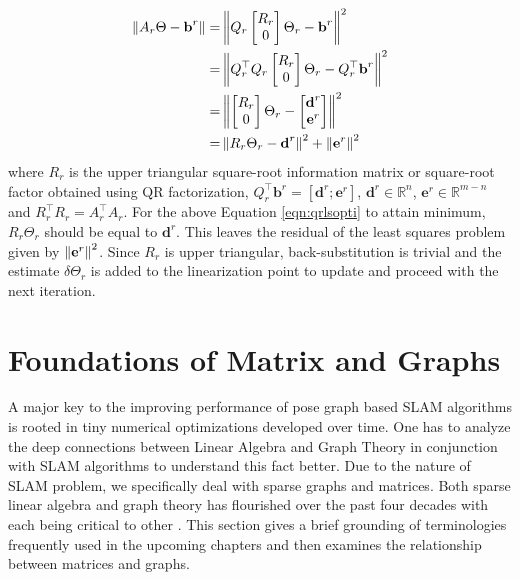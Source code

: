 \begin{align}
\left\lVert A_r\Theta-\textbf{b}^r\right\rVert = & \left\lVert Q_r \begin{bmatrix}
R_r \\
0
\end{bmatrix}\Theta_r - \textbf{b}^r\right\rVert^2 \\
= & \left\lVert Q_r^{\top}Q_r\begin{bmatrix}
R_r \\
0
\end{bmatrix}\Theta_r - Q_r^{\top}\textbf{b}^r\right\rVert^2 \\
= & \left\lVert\begin{bmatrix}
R_r \\
0
\end{bmatrix}\Theta_r - \begin{bmatrix}
\textbf{d}^r \\
\textbf{e}^r
\end{bmatrix}\right\rVert^2 \\
= & \left\lVert R_r\Theta_r - \textbf{d}^r\right\rVert^2 + \left\lVert\textbf{e}^r\right\rVert^2
\label{eqn:qrlsopti}
\end{align}
where $R_r$ is the upper triangular square-root information matrix or square-root factor obtained using QR factorization, $Q_r^{\top}\textbf{b}^r = [\textbf{d}^r; \textbf{e}^r]$, $\textbf{d}^r \in \mathbb{R}^n$, $\textbf{e}^r \in \mathbb{R}^{m-n}$ and $R_r^{\top}R_r = A_r^{\top}A_r$. For the above Equation \ref{eqn:qrlsopti} to attain minimum, $R_r\Theta_r $ should be equal to $\textbf{d}^r$. This leaves the residual of the least squares problem given by $\left\lVert\textbf{e}^r\right\rVert^2$. Since $R_r$ is upper triangular, back-substitution is trivial and the estimate $\delta\Theta_r$ is added to the linearization point to update and proceed with the next iteration.

\section{Foundations of Matrix and Graphs}
A major key to the improving performance of pose graph based SLAM algorithms is rooted in tiny numerical optimizations developed over time. One has to analyze the deep connections between Linear Algebra and Graph Theory in conjunction with SLAM algorithms to understand this fact better. Due to the nature of SLAM problem, we specifically deal with sparse graphs and matrices. Both sparse linear algebra and graph theory has flourished over the past four decades with each being critical to other \cite{graphandla}. This section gives a brief grounding of terminologies frequently used in the upcoming chapters and then examines the relationship between matrices and graphs. 

